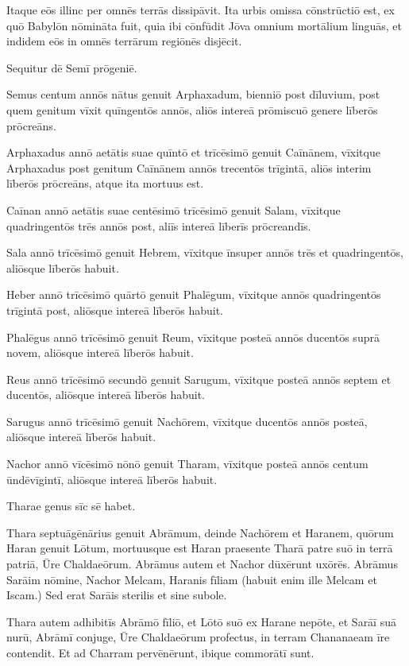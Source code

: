 \Versus Itaque eōs illinc per omnēs terrās dissipāvit. Ita urbis omissa cōnstrūctiō est,
\Versus ex quō Babylōn nōmināta fuit, quia ibi cōnfūdit Jōva omnium mortālium linguās, et indidem eōs in omnēs terrārum regiōnēs disjēcit.

\Versus Sequitur dē Semī prōgeniē.

Semus centum annōs nātus genuit Arphaxadum, bienniō post dīluvium,
\Versus post quem genitum vīxit quīngentōs annōs, aliōs intereā prōmiscuō genere līberōs prōcreāns.

\Versus Arphaxadus annō aetātis suae quīntō et trīcēsimō genuit Caīnānem,
\Versus vīxitque Arphaxadus post genitum Caīnānem annōs trecentōs trīgintā, aliōs interim līberōs prōcreāns, atque ita mortuus est.

\Versus Caīnan annō aetātis suae centēsimō trīcēsimō genuit Salam,
\Versus vīxitque quadringentōs trēs annōs post, aliīs intereā līberīs prōcreandīs.

\Versus Sala annō trīcēsimō genuit Hebrem,
\Versus vīxitque īnsuper annōs trēs et quadringentōs, aliōsque līberōs habuit.

\Versus Heber annō trīcēsimō quārtō genuit Phalēgum,
\Versus vīxitque annōs quadringentōs trīgintā post, aliōsque intereā līberōs habuit.

\Versus Phalēgus annō trīcēsimō genuit Reum,
\Versus vīxitque posteā annōs ducentōs suprā novem, aliōsque intereā līberōs habuit.

\Versus Reus annō trīcēsimō secundō genuit Sarugum,
\Versus vīxitque posteā annōs septem et ducentōs, aliōsque intereā līberōs habuit.

\Versus Sarugus annō trīcēsimō genuit Nachōrem,
\Versus vīxitque ducentōs annōs posteā, aliōsque intereā līberōs habuit.

\Versus Nachor annō vīcēsimō nōnō genuit Tharam,
\Versus vīxitque posteā annōs centum ūndēvīgintī, aliōsque intereā līberōs habuit.

\Versus Tharae genus sīc sē habet.

Thara septuāgēnārius genuit Abrāmum, deinde Nachōrem et Haranem,
\Versus quōrum Haran genuit Lōtum,
\Versus mortuusque est Haran praesente Tharā patre suō in terrā patriā, Ūre Chaldaeōrum.
\Versus Abrāmus autem et Nachor dūxērunt uxōrēs. Abrāmus Sarāim nōmine, Nachor Melcam, Haranis fīliam (habuit enim ille Melcam et Iscam.)
\Versus Sed erat Sarāis sterilis et sine subole.

\Versus Thara autem adhibitīs Abrāmō fīliō, et Lōtō suō ex Harane nepōte, et Sarāī suā nurū, Abrāmī conjuge, Ūre Chaldaeōrum profectus, in terram Chananaeam īre contendit. Et ad Charram pervēnērunt, ibique commorātī sunt.

